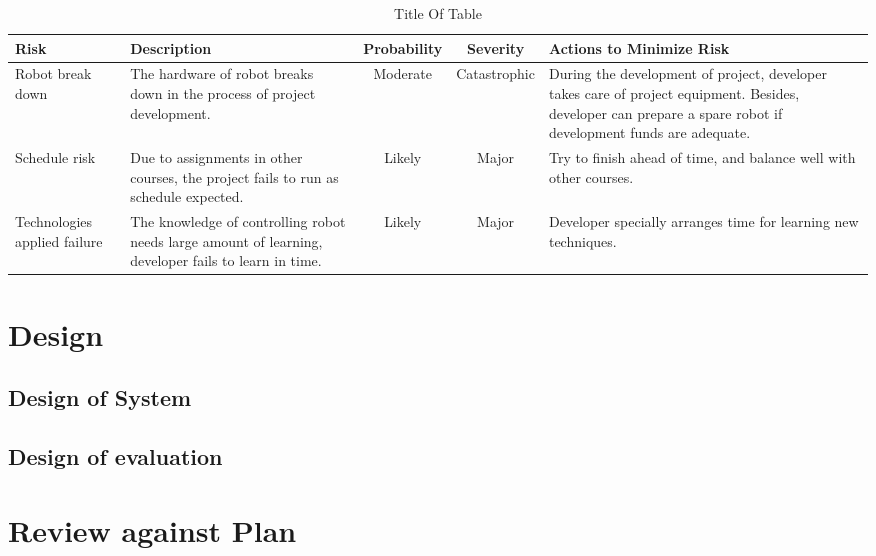 \documentclass[11pt,times,oneside,openright,hardcopy]{eeereport}
\begin{document}
\begin{table}[h]
\label{tab:tab1}
\centering
\caption{ Title Of Table }
\renewcommand{\arraystretch}{2}
\setlength{\tabcolsep}{10pt}
\begin{tabular}{ | m{2cm} | m{3cm} | c | c | m{3cm} |} 
\hline Risk & Description & Probability & Severity & Actions to Minimize Risk \\ 
\hline Robot break down & The hardware of robot breaks down in the process of project development. & Moderate & Catastrophic & During the development of project, developer takes care of project equipment. Besides, developer can prepare a spare robot if development funds are adequate. \\ 
\hline Schedule risk & Due to assignments in other courses, the project fails to run as schedule expected. & Likely & Major & Try to finish ahead of time, and balance well with other courses. \\ 
\hline Technologies applied failure & The knowledge of controlling robot needs large amount of learning, developer fails to learn in time. & Likely & Major & Developer specially arranges time for learning new techniques. \\ 
\hline 
\end{tabular} 
\end{table}

\chapter{Design}\label{cpt:des}
\section{Design of System}
\section{Design of evaluation}

\chapter{Review against Plan}






\end{document}

